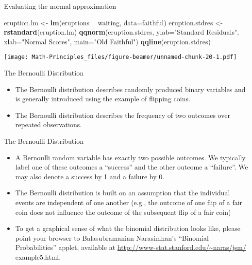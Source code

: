 \documentclass[
  ignorenonframetext,
]{beamer}
\newenvironment{Shaded}{\begin{snugshade}}{\end{snugshade}}
\newcommand{\DataTypeTok}[1]{\textcolor[rgb]{0.13,0.29,0.53}{#1}}
\newcommand{\KeywordTok}[1]{\textcolor[rgb]{0.13,0.29,0.53}{\textbf{#1}}}
\newcommand{\NormalTok}[1]{#1}
\newcommand{\OperatorTok}[1]{\textcolor[rgb]{0.81,0.36,0.00}{\textbf{#1}}}
\newcommand{\StringTok}[1]{\textcolor[rgb]{0.31,0.60,0.02}{#1}}
\begin{document}
\begin{frame}[fragile]{Evaluating the normal approximation}
\protect\hypertarget{evaluating-the-normal-approximation-1}{}

\begin{Shaded}
\begin{Highlighting}[]
\NormalTok{eruption.lm <-}\StringTok{ }\KeywordTok{lm}\NormalTok{(eruptions }\OperatorTok{~}\StringTok{ }\NormalTok{waiting, }\DataTypeTok{data=}\NormalTok{faithful)}
\NormalTok{eruption.stdres <-}\StringTok{ }\KeywordTok{rstandard}\NormalTok{(eruption.lm)}
\KeywordTok{qqnorm}\NormalTok{(eruption.stdres,}
       \DataTypeTok{ylab=}\StringTok{"Standard Residuals"}\NormalTok{,}
       \DataTypeTok{xlab=}\StringTok{"Normal Scores"}\NormalTok{,}
       \DataTypeTok{main=}\StringTok{"Old Faithful"}\NormalTok{)}
\KeywordTok{qqline}\NormalTok{(eruption.stdres)}
\end{Highlighting}
\end{Shaded}

\texttt{[image: Math-Principles\_files/figure-beamer/unnamed-chunk-20-1.pdf]}

\end{frame}

\begin{frame}{The Bernoulli Distribution}
\protect\hypertarget{the-bernoulli-distribution}{}

\begin{itemize}
\item
  The Bernoulli distribution describes randomly produced binary
  variables and is generally introduced using the example of flipping
  coins.
\item
  The Bernoulli distribution describes the frequency of two outcomes
  over repeated observations.
\end{itemize}

\end{frame}

\begin{frame}{The Bernoulli Distribution}
\protect\hypertarget{the-bernoulli-distribution-1}{}

\begin{itemize}
\item
  A Bernoulli random variable has exactly two possible outcomes. We
  typically label one of these outcomes a ``success'' and the other
  outcome a ``failure''. We may also denote a success by 1 and a failure
  by 0.
\item
  The Bernoulli distribution is built on an assumption that the
  individual events are independent of one another (e.g., the outcome of
  one flip of a fair coin does not influence the outcome of the
  subsequent flip of a fair coin)
\item
  To get a graphical sense of what the binomial distribution looks like,
  please point your browser to Balasubramanian Narasimhan's ``Binomial
  Probabilities'' applet, available at
  \url{http://www-stat.stanford.edu/~naras/jsm/} example5.html.
\end{itemize}

\end{frame}
\end{document}
